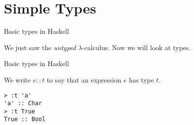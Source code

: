 
\section{Simple Types}

%
\begin{frame}{Basic types in Haskell}

We just saw the \emph{untyped} $\lambda$-calculus. Now we will look at types.

\end{frame}

%
\begin{frame}[fragile]{Basic types in Haskell}

We write $e::t$ to say that an expression $e$ has type $t$.

\begin{verbatim}
> :t 'a'
'a' :: Char
> :t True
True :: Bool
\end{verbatim}

\end{frame}

